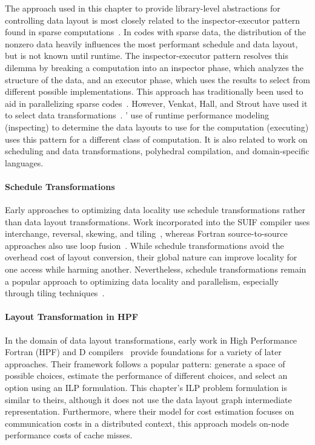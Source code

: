 The approach used in this chapter to provide library-level abstractions for controlling data layout is most closely related to the inspector-executor pattern found in sparse computations~\cite{strout2018sparse}.
In codes with sparse data, the distribution of the nonzero data heavily influences the most performant schedule and data layout, but is not known until runtime.
The inspector-executor pattern resolves this dilemma by breaking a computation into an inspector phase, which analyzes the structure of the data, and an executor phase, which uses the results to select from different possible implementations.
This approach has traditionally been used to aid in parallelizing sparse codes~\cite{ujaldon1996parallelization,fu1996run,venkat2016automating}.
However, Venkat, Hall, and Strout have used it to select data transformations~\cite{venkat2015loop}.
\FormatDecisions' use of runtime performance modeling (inspecting) to determine the data layouts to use for the computation (executing) uses this pattern for a different class of computation.
It is also related to work on scheduling and data transformations, polyhedral compilation, and domain-specific languages.

\paragraph{Schedule Transformations}
Early approaches to optimizing data locality use schedule transformations rather than data layout transformations. 
Work incorporated into the SUIF compiler uses interchange, reversal, skewing, and tiling~\cite{wolf1991data}, whereas Fortran source-to-source approaches also use loop fusion~\cite{mckinley1996improving}.
While schedule transformations avoid the overhead cost of layout conversion, their global nature can improve locality for one access while harming another.
Nevertheless, schedule transformations remain a popular approach to optimizing data locality and parallelism, 
especially through tiling techniques~\cite{bondhugula2008pluto,bertolacci2015parameterized,bondhugula2016diamond,bandishti2012tiling,unat2016tida}.

\paragraph{Layout Transformation in HPF}
In the domain of data layout transformations, early work in High Performance Fortran (HPF) and D compilers~\cite{bixby1994automatic,kennedy1995automatic,kennedy1998automatic} provide foundations for a variety of later approaches.
Their framework follows a popular pattern: generate a space of possible choices, estimate the performance of different choices, and select an option using an ILP formulation. 
This chapter's ILP problem formulation is similar to theirs, although it does not use the data layout graph intermediate representation.
Furthermore, where their model for cost estimation focuses on communication costs in a distributed context, this approach models on-node performance costs of cache misses.

